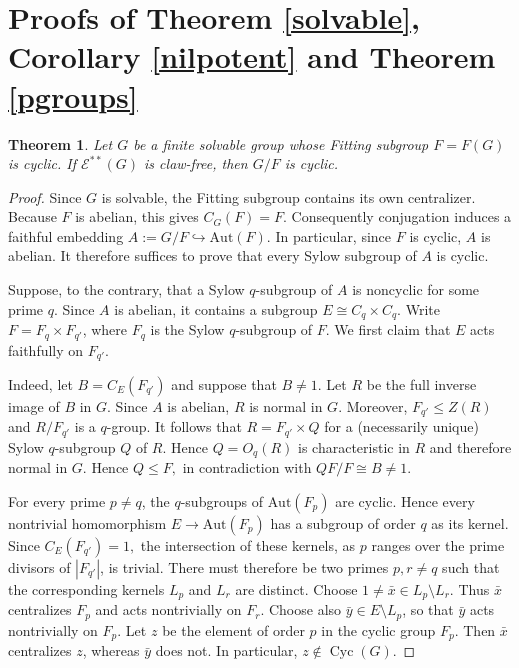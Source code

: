 \documentclass[preprint,11pt]{elsarticle}
\newcommand{\cyc}{\operatorname{Cyc}}
\newcommand{\CG}[2]{C_{#1}(#2)}
\newtheorem{theorem}{\bf Theorem}[section]
\begin{document}
\section{Proofs of Theorem \ref{solvable}, Corollary \ref{nilpotent} and Theorem \ref{pgroups}}

\begin{theorem}\label{Thm:F(G)-cyclic}
   Let $G$ be a finite solvable group whose Fitting subgroup $F=F(G)$ is
   cyclic.  If $\mathcal E^{**}(G)$ is claw-free, then $G/F$ is cyclic.
\end{theorem}

\begin{proof}
Since $G$ is solvable, the Fitting subgroup contains its own
centralizer. Because $F$ is abelian, this gives
$
   \CG{G}{F}=F.
$
Consequently conjugation induces a faithful embedding
$
   A:=G/F\hookrightarrow \text{Aut}(F).
$
In particular, since $F$ is cyclic, $A$ is abelian.  It therefore suffices to prove that every
Sylow subgroup of $A$ is cyclic.

Suppose, to the contrary, that a Sylow $q$-subgroup of $A$ is noncyclic for
some prime $q$.  Since $A$ is abelian, it contains a subgroup
$
   E\cong C_q\times C_q.
$
Write $F=F_q\times F_{q'}$, where $F_q$ is the Sylow $q$-subgroup of $F$.
We first claim that $E$ acts faithfully on $F_{q'}$.

Indeed, let
$ B=\CG{E}{F_{q'}}$
and suppose that $B\ne 1$.  Let $R$ be the full inverse image of $B$ in $G$.
Since $A$ is abelian, $R$ is normal in $G$.  Moreover, $F_{q'}\le Z(R)$ and
$R/F_{q'}$ is a $q$-group.  It follows that
$R=F_{q'}\times Q$
for a (necessarily unique) Sylow $q$-subgroup $Q$ of $R$.  Hence
$Q=O_{q}(R)$ is characteristic in $R$ and therefore normal in $G$. 
Hence $Q\leq F,$ in contradiction with $QF/F\cong B\ne 1$.

For every prime $p\ne q$, the $q$-subgroups of
$\text{Aut}(F_p)$ are cyclic.  Hence
every nontrivial homomorphism
$  E\longrightarrow\text{Aut}(F_p)
$
has a subgroup of order $q$ as its kernel.  Since $\CG{E}{F_{q'}}=1,$
the intersection of these
kernels, as $p$ ranges over the prime divisors of $|F_{q'}|$, is trivial.
There must therefore be two primes $p,r\ne q$ such that the corresponding
kernels $L_p$ and $L_r$ are distinct.
Choose
$1\ne \bar{x}\in L_p\setminus L_r.
$
Thus $\bar{x}$ centralizes $F_p$ and acts nontrivially on $F_r$. Choose also
$\bar{y}\in E\setminus L_p$, so that $\bar{y}$ acts nontrivially on $F_p$.
Let $z$ be the element of order $p$ in the cyclic group $F_p$. Then
$\bar{x}$ centralizes $z$, whereas $\bar{y}$ does not.  In particular,
$z\notin\cyc(G).
$


\end{proof}
\end{document}
